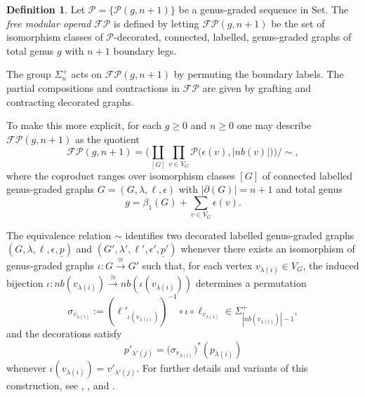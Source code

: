 \documentclass{amsart}
\newcommand{\Set}{\mathrm{Set}}
\newcommand{\calP}{\mathcal{P}}
\newcommand{\nb}{nb}
\theoremstyle{definition}
\newtheorem{definition}[theorem]{Definition}%
\numberwithin{equation}{section}
\begin{document}
\begin{definition}\label{def: free modular operad}
Let $\calP=\{\calP(g,n+1)\}$ be a genus-graded sequence in $\Set$. The \emph{free modular operad} $\mathcal{F}\calP$ is defined by letting $\mathcal{F}\calP(g,n+1)$ be the set of isomorphism classes of $\calP$-decorated, connected, labelled, genus-graded graphs of total genus $g$ with $n+1$ boundary legs.

The group $\Sigma_n^+$ acts on $\mathcal{F}\calP(g,n+1)$ by permuting the boundary labels. The partial compositions and contractions in $\mathcal{F}\calP$ are given by grafting and contracting decorated graphs.
\end{definition}

To make this more explicit, for each $g\ge 0$ and $n\ge 0$ one may describe $\mathcal{F}\calP(g,n+1)$ as the quotient
\[
\mathcal{F}\calP(g,n+1)=
\Biggl(
\coprod_{[G]} \prod_{v\in V_G}\calP\bigl(\epsilon(v),|\nb(v)|\bigr)
\Biggr)\Big/\sim,
\]
where the coproduct ranges over isomorphism classes $[G]$ of connected labelled genus-graded graphs $G=(G,\lambda,\ell,\epsilon)$
with $|\partial(G)|=n+1$ and total genus
\[
g=\beta_1(G)+\sum_{v\in V_G}\epsilon(v).
\]

The equivalence relation $\sim$ identifies two decorated labelled genus-graded graphs $(G,\lambda,\ell,\epsilon,\underline{p})$ and $(G',\lambda',\ell',\epsilon',\underline{p}')$ whenever there exists an isomorphism of genus-graded graphs $\iota:G\xrightarrow{\cong} G'$ such that, for each vertex $v_{\lambda(i)}\in V_G$, the induced bijection $\iota:\nb(v_{\lambda(i)})\xrightarrow{\cong}\nb(\iota(v_{\lambda(i)}))$ determines a permutation
\[
\sigma_{v_{\lambda(i)}}:=
(\ell'_{\iota(v_{\lambda(i)})})^{-1}\circ \iota\circ \ell_{v_{\lambda(i)}}
\in \Sigma_{|\nb(v_{\lambda(i)})|-1}^+,
\]
and the decorations satisfy
\[
p'_{\lambda'(j)}=\bigl(\sigma_{v_{\lambda(i)}}\bigr)^*(p_{\lambda(i)})
\]
whenever $\iota(v_{\lambda(i)})=v'_{\lambda'(j)}$.  For further details and variants of this construction, see \cite[2.20]{gk_modular}, \cite[2.1]{hry_modular_nerve}, and \cite[13.2.2]{yau_modular}.
\end{document}
